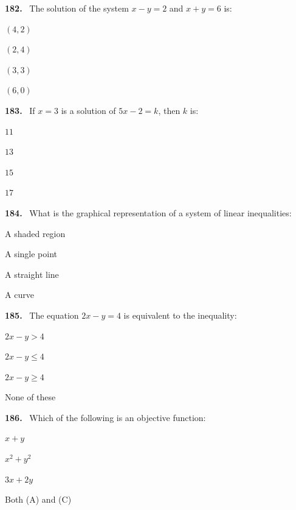 \documentclass[11pt]{article}
\newenvironment{qenv}[1]{%
  \par\medskip\noindent\textbf{#1.}\ \ignorespaces
}{\par}
\begin{document}
\begin{qenv}{182} The solution of the system $x-y=2$ and $x+y=6$ is:
\begin{options} \item $(4,2)$ \item $(2,4)$ \item $(3,3)$ \item $(6,0)$ \end{options} \end{qenv}

\begin{qenv}{183} If $x=3$ is a solution of $5x-2=k$, then $k$ is:
\begin{options} \item $11$ \item $13$ \item $15$ \item $17$ \end{options} \end{qenv}

\begin{qenv}{184} What is the graphical representation of a system of linear inequalities:
\begin{options} \item A shaded region \item A single point \item A straight line \item A curve \end{options} \end{qenv}

\begin{qenv}{185} The equation $2x-y=4$ is equivalent to the inequality:
\begin{options} \item $2x-y>4$ \item $2x-y\leq 4$ \item $2x-y\geq 4$ \item None of these \end{options} \end{qenv}

\begin{qenv}{186} Which of the following is an objective function:
\begin{options} \item $x+y$ \item $x^2+y^2$ \item $3x+2y$ \item Both (A) and (C) \end{options} \end{qenv}
\end{document}
